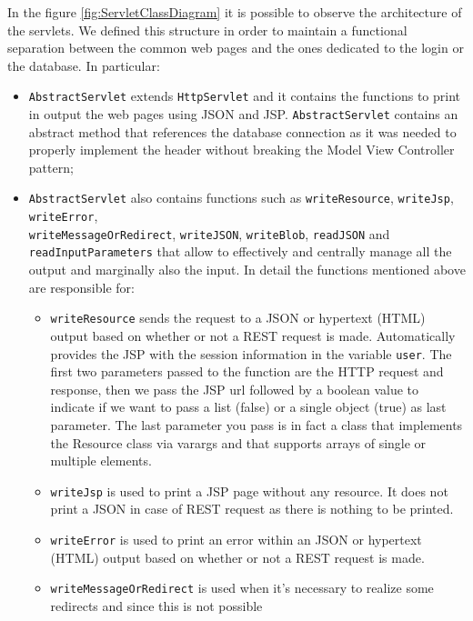 In the figure \ref{fig:ServletClassDiagram} it is possible to observe the 
architecture of the servlets.
We defined this structure in order to maintain a functional separation 
between the common web pages and the ones dedicated to the login or the database.
In particular: 
\begin{itemize}
    \item \texttt{AbstractServlet} extends \texttt{HttpServlet} and
    it contains the functions to print in output the web pages using JSON and JSP.
    \texttt{AbstractServlet} contains an abstract method that references the 
    database connection as it was needed to properly implement the header
    without breaking the Model View Controller pattern;

    \item \texttt{AbstractServlet} also contains functions such as
    \texttt{writeResource}, \texttt{writeJsp}, \texttt{writeError}, \\
    \texttt{writeMessageOrRedirect}, \texttt{writeJSON}, \texttt{writeBlob},
    \texttt{readJSON}  and \texttt{readInputParameters}
    that allow to effectively and centrally manage all the output
    and marginally also the input.
    In detail the functions mentioned above are responsible for: 
    \begin{itemize}
        \item \texttt{writeResource} sends the request to a JSON
        or hypertext (HTML) output based on whether or not a REST request is made.
        Automatically provides the JSP with the session information in
        the variable \texttt{user}.
        The first two parameters passed to the function are the HTTP request and 
        response, then we pass the JSP url followed by a boolean
        value to indicate if we want to pass a list (false) or a single object (true) as last parameter.
        The last parameter you pass is in fact a class that implements the
        Resource class via varargs and that supports arrays of single or multiple elements.
        \item \texttt{writeJsp} is used to print a JSP page without any resource.
        It does not print a JSON in case of REST request as there is nothing to be printed.
        \item \texttt{writeError}  is used to print an error within an
        JSON or hypertext (HTML) output based on whether or not a REST request is made.
        \item \texttt{writeMessageOrRedirect} is used when it's necessary to realize some redirects and since this is not possible

\end{itemize}
\end{itemize}
